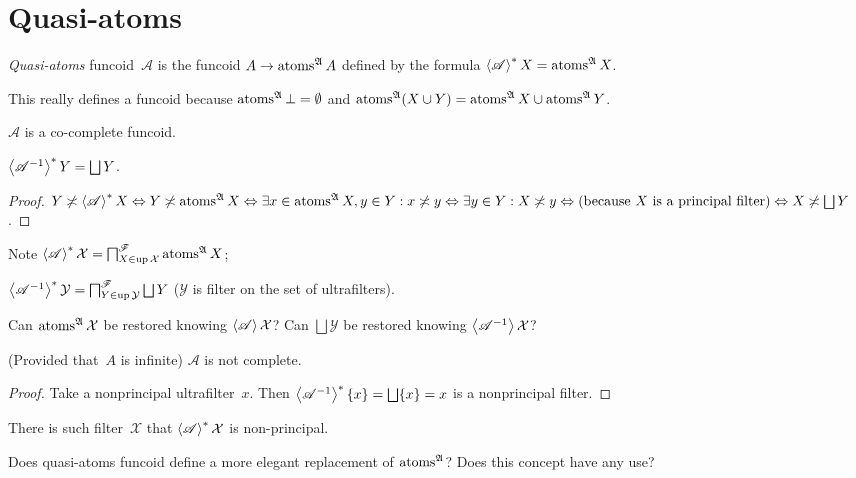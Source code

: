 \chapter{Quasi-atoms}

\begin{defn}
\emph{Quasi-atoms} funcoid~$\mathscr{A}$ is the funcoid $A\rightarrow \operatorname{atoms}^{\mathfrak{A}} A$ defined by the formula
$\left\langle \mathscr{A}\right\rangle ^{\ast} X = \operatorname{atoms}^{\mathfrak{A}} X$.
\end{defn}

This really defines a funcoid because $\operatorname{atoms}^{\mathfrak{A}} \bot = \emptyset$ and
$\operatorname{atoms}^{\mathfrak{A}}(X\cup Y) = \operatorname{atoms}^{\mathfrak{A}}X\cup\operatorname{atoms}^{\mathfrak{A}}Y$.

\begin{obvious}
$\mathscr{A}$ is a co-complete funcoid.
\end{obvious}

\begin{prop}
$\rsupfun{\mathscr{A}^{-1}} Y = \bigsqcup Y$.
\end{prop}

\begin{proof}
$Y \nasymp \left\langle \mathscr{A} \right\rangle^{\ast} X \Leftrightarrow Y
\nasymp \atoms^{\mathfrak{A}} X \Leftrightarrow \exists x \in
\atoms^{\mathfrak{A}} X, y \in Y : x \nasymp y \Leftrightarrow \exists y
\in Y : X \nasymp y \Leftrightarrow \text{(because $X$ is a principal filter)}
\Leftrightarrow X \nasymp \bigsqcup Y$.
\end{proof}

Note
$\left\langle \mathscr{A}\right\rangle ^{\ast} \mathcal{X} =
\bigsqcap^{\mathscr{F}}_{X \in \operatorname{up} \mathcal{X}}
\operatorname{atoms}^{\mathfrak{A}} X$;

$\rsupfun{\mathscr{A}^{-1}} \mathcal{Y} =
\bigsqcap^{\mathscr{F}}_{Y \in \up \mathcal{Y}} \bigsqcup Y$
($\mathcal{Y}$ is filter on the set of ultrafilters).

Can $\operatorname{atoms}^{\mathfrak{A}} \mathcal{X}$ be restored knowing $\left\langle \mathscr{A}\right\rangle \mathcal{X}$?
Can $\bigsqcup \mathcal{Y}$ be restored knowing $\left\langle \mathscr{A}^{-1}\right\rangle \mathcal{X}$?

\begin{prop}
(Provided that~$A$ is infinite) $\mathscr{A}$ is not complete.
\end{prop}

\begin{proof}
Take a nonprincipal ultrafilter~$x$. Then $\rsupfun{\mathscr{A}^{-1}}\{x\} = \bigsqcup\{x\} = x$
is a nonprincipal filter.
\end{proof}

\begin{conjecture}
There is such filter~$\mathcal{X}$ that $\left\langle \mathscr{A}\right\rangle ^{\ast} \mathcal{X}$ is non-principal.
\end{conjecture}

Does quasi-atoms funcoid define a more elegant replacement of $\operatorname{atoms}^{\mathfrak{A}}$? Does this concept have any use?